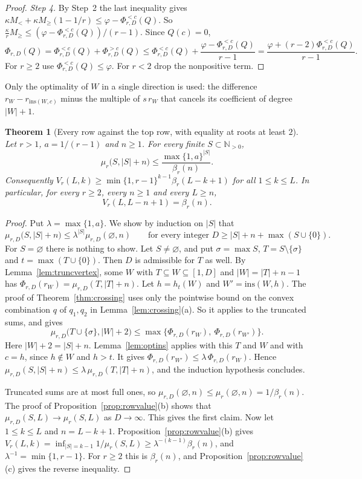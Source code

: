 \documentclass[11pt]{article}
\newtheorem{theorem}{Theorem}[section]
\newcommand{\N}{\mathbb N}
\begin{document}
\begin{proof}
\emph{Step 4.}  By Step~2 the last inequality gives
$\kappa M_<+\kappa M_\ge(1-1/r)\le\varphi-\Phi_{r,D}^{<c}(Q)$.  So
$\frac\kappa rM_\ge\le(\varphi-\Phi_{r,D}^{<c}(Q))/(r-1)$.  Since $Q(c)=0$,
\[
  \Phi_{r,D}(Q)=\Phi_{r,D}^{<c}(Q)+\Phi_{r,D}^{>c}(Q)
  \le\Phi_{r,D}^{<c}(Q)+\frac{\varphi-\Phi_{r,D}^{<c}(Q)}{r-1}
  =\frac{\varphi+(r-2)\Phi_{r,D}^{<c}(Q)}{r-1}.
\]
For $r\ge2$ use $\Phi_{r,D}^{<c}(Q)\le\varphi$.  For $r<2$ drop the
nonpositive term.
\end{proof}

Only the optimality of $W$ in a single direction is used: the difference
$r_W-r_{\mathrm{ins}(W,c)}$ minus the multiple of $s\,r_W$ that cancels its
coefficient of degree $|W|+1$.

\begin{theorem}[Every row against the top row, with equality at roots at least $2$]\label{thm:allrowstwo}
Let $r>1$, $a=1/(r-1)$ and $n\ge1$.  For every finite $S\subset\N_{>0}$,
\[
  \mu_r\bigl(S,|S|+n\bigr)\le\frac{\max\{1,a\}^{|S|}}{\beta_r(n)} .
\]
Consequently $V_r(L,k)\ge\min\{1,r-1\}^{k-1}\beta_r(L-k+1)$ for all
$1\le k\le L$.  In particular, for every $r\ge2$, every $n\ge1$ and every
$L\ge n$,
\[
  V_r(L,L-n+1)=\beta_r(n).
\]
\end{theorem}

\begin{proof}
Put $\lambda=\max\{1,a\}$.  We show by induction on $|S|$ that
\[
  \mu_{r,D}\bigl(S,|S|+n\bigr)\le\lambda^{|S|}\mu_{r,D}(\varnothing,n)
  \qquad\text{for every integer }D\ge|S|+n+\max(S\cup\{0\}).
\]
For $S=\varnothing$ there is nothing to show.  Let $S\ne\varnothing$, and put
$\sigma=\max S$, $T=S\setminus\{\sigma\}$ and $t=\max(T\cup\{0\})$.  Then $D$
is admissible for $T$ as well.  By Lemma~\ref{lem:truncvertex}, some $W$ with
$T\subseteq W\subseteq[1,D]$ and $|W|=|T|+n-1$ has
$\Phi_{r,D}(r_W)=\mu_{r,D}(T,|T|+n)$.  Let $h=h_t(W)$ and
$W'=\mathrm{ins}(W,h)$.  The proof of Theorem~\ref{thm:crossing} uses only
the pointwise bound on the convex combination $q$ of $q_1,q_2$ in
Lemma~\ref{lem:crossing}(a).  So it applies to the truncated sums, and gives
\[
  \mu_{r,D}\bigl(T\cup\{\sigma\},|W|+2\bigr)\le
  \max\bigl\{\Phi_{r,D}(r_W),\ \Phi_{r,D}(r_{W'})\bigr\}.
\]
Here $|W|+2=|S|+n$.  Lemma~\ref{lem:optins} applies with this $T$ and $W$
and with $c=h$, since $h\notin W$ and $h>t$.  It gives
$\Phi_{r,D}(r_{W'})\le\lambda\,\Phi_{r,D}(r_W)$.  Hence
$\mu_{r,D}(S,|S|+n)\le\lambda\,\mu_{r,D}(T,|T|+n)$, and the induction
hypothesis concludes.

Truncated sums are at most full ones, so
$\mu_{r,D}(\varnothing,n)\le\mu_r(\varnothing,n)=1/\beta_r(n)$.  The proof of
Proposition~\ref{prop:rowvalue}(b) shows that $\mu_{r,D}(S,L)\to\mu_r(S,L)$
as $D\to\infty$.  This gives the first claim.  Now let $1\le k\le L$ and
$n=L-k+1$.  Proposition~\ref{prop:rowvalue}(b) gives
$V_r(L,k)=\inf_{|S|=k-1}1/\mu_r(S,L)\ge\lambda^{-(k-1)}\beta_r(n)$, and
$\lambda^{-1}=\min\{1,r-1\}$.  For $r\ge2$ this is $\beta_r(n)$, and
Proposition~\ref{prop:rowvalue}(c) gives the reverse inequality.
\end{proof}
\end{document}
